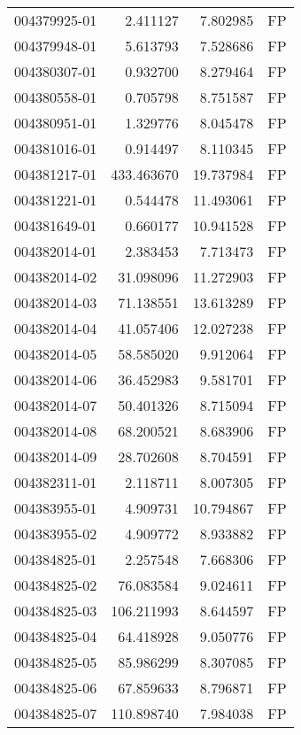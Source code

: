 \begin{tabular}{lrrl}
004379925-01 &    2.411127 &       7.802985 &   FP \\
004379948-01 &    5.613793 &       7.528686 &   FP \\
004380307-01 &    0.932700 &       8.279464 &   FP \\
004380558-01 &    0.705798 &       8.751587 &   FP \\
004380951-01 &    1.329776 &       8.045478 &   FP \\
004381016-01 &    0.914497 &       8.110345 &   FP \\
004381217-01 &  433.463670 &      19.737984 &   FP \\
004381221-01 &    0.544478 &      11.493061 &   FP \\
004381649-01 &    0.660177 &      10.941528 &   FP \\
004382014-01 &    2.383453 &       7.713473 &   FP \\
004382014-02 &   31.098096 &      11.272903 &   FP \\
004382014-03 &   71.138551 &      13.613289 &   FP \\
004382014-04 &   41.057406 &      12.027238 &   FP \\
004382014-05 &   58.585020 &       9.912064 &   FP \\
004382014-06 &   36.452983 &       9.581701 &   FP \\
004382014-07 &   50.401326 &       8.715094 &   FP \\
004382014-08 &   68.200521 &       8.683906 &   FP \\
004382014-09 &   28.702608 &       8.704591 &   FP \\
004382311-01 &    2.118711 &       8.007305 &   FP \\
004383955-01 &    4.909731 &      10.794867 &   FP \\
004383955-02 &    4.909772 &       8.933882 &   FP \\
004384825-01 &    2.257548 &       7.668306 &   FP \\
004384825-02 &   76.083584 &       9.024611 &   FP \\
004384825-03 &  106.211993 &       8.644597 &   FP \\
004384825-04 &   64.418928 &       9.050776 &   FP \\
004384825-05 &   85.986299 &       8.307085 &   FP \\
004384825-06 &   67.859633 &       8.796871 &   FP \\
004384825-07 &  110.898740 &       7.984038 &   FP \\

\end{tabular}

